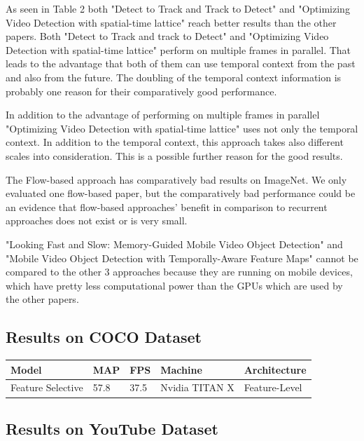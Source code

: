 \documentclass[conference]{IEEEtran}
\begin{document}
As seen in Table 2 both "Detect to Track and Track to Detect" and "Optimizing Video Detection with spatial-time lattice" reach better results than the other papers. Both "Detect to Track and track to Detect" and "Optimizing Video Detection with spatial-time lattice" perform on multiple frames in parallel. That leads to the advantage that both of them can use temporal context from the past and also from the future. The doubling of the temporal context information is probably one reason for their comparatively good performance. \newline

In addition to the advantage of performing on multiple frames in parallel "Optimizing Video Detection with spatial-time lattice" uses not only the temporal context. In addition to the temporal context, this approach takes also different scales into consideration. This is a possible further reason for the good results. \newline

The Flow-based approach \cite{b3} has comparatively bad results on ImageNet. We only evaluated one flow-based paper, but the comparatively bad performance could be an evidence that flow-based approaches' benefit in comparison to recurrent approaches does not exist or is very small. \newline

"Looking Fast and Slow: Memory-Guided Mobile Video Object Detection" and "Mobile Video Object Detection with Temporally-Aware Feature Maps" cannot be compared to the other 3 approaches because they are running on mobile devices, which have pretty less computational power than the GPUs which are used by the other papers.  

\subsection{Results on COCO Dataset}

\begin{tabular}{ | p{2cm} | p{2em}| p{2em} | p{4em} | p{5em} | } 
 \hline
 Model & MAP & FPS & Machine & Architecture \\
 \hline
 Feature Selective \cite{b6} & 57.8 & 37.5 & Nvidia TITAN X & Feature-Level \\
 \hline
\end{tabular}

\subsection{Results on YouTube Dataset}
\end{document}
